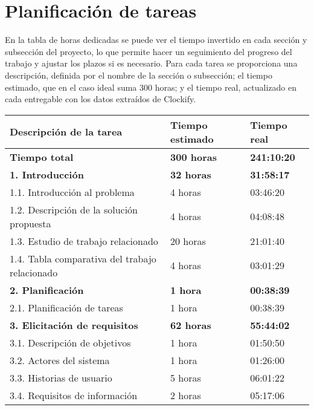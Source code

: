 
\section{Planificación de tareas}\label{sec:planificacion-tareas}

En la tabla de horas dedicadas se puede ver el tiempo invertido en cada sección y subsección del proyecto, lo que permite hacer un seguimiento del progreso del trabajo y ajustar los plazos si es necesario. Para cada tarea se proporciona una descripción, definida por el nombre de la sección o subsección; el tiempo estimado, que en el caso ideal suma 300 horas; y el tiempo real, actualizado en cada entregable con los datos extraídos de Clockify.

\begin{table}[!ht]
    \centering
    \begin{tabular}{|l|l|l|}
    \hline
        \textbf{Descripción de la tarea} & \textbf{Tiempo estimado} & \textbf{Tiempo real} \\ \hline
        \textbf{Tiempo total} & \textbf{300 horas} & \textbf{241:10:20} \\ \hline
        \textbf{1.  Introducción} & \textbf{32 horas} & \textbf{31:58:17} \\ \hline
        1.1. Introducción al problema & 4 horas & 03:46:20 \\ \hline
        1.2. Descripción de la solución propuesta & 4 horas & 04:08:48 \\ \hline
        1.3. Estudio de trabajo relacionado & 20 horas & 21:01:40 \\ \hline
        1.4. Tabla comparativa del trabajo relacionado & 4 horas & 03:01:29 \\ \hline
        \textbf{2.  Planificación} & \textbf{1 hora} & \textbf{00:38:39} \\ \hline
        2.1. Planificación de tareas & 1 hora & 00:38:39 \\ \hline
        \textbf{3. Elicitación de requisitos} & \textbf{62 horas} & \textbf{55:44:02} \\ \hline
        3.1. Descripción de objetivos & 1 hora & 01:50:50 \\ \hline
        3.2. Actores del sistema & 1 hora & 01:26:00 \\ \hline
        3.3. Historias de usuario & 5 horas & 06:01:22 \\ \hline
        3.4. Requisitos de información & 2 horas & 05:17:06 \\ \hline

\end{tabular}
\end{table}
